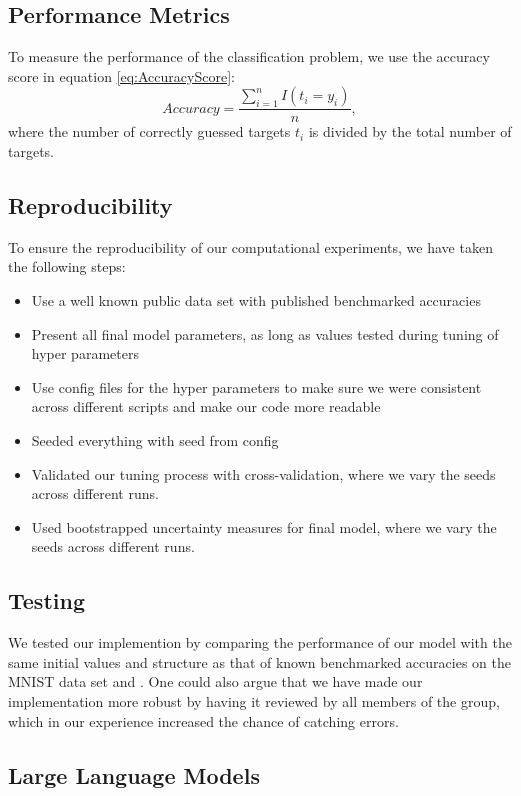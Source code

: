 \subsection{Performance Metrics}

To measure the performance of the classification problem, we use the accuracy score in equation \ref{eq:AccuracyScore}: \begin{equation}
    Accuracy = \frac{\sum_{i=1}^n I(t_i = y_i)}{n},
    \label{eq:AccuracyScore}
\end{equation}
where the number of correctly guessed targets $t_i$ is divided by the total number of targets.

\subsection{Reproducibility}
To ensure the reproducibility of our computational experiments, we have taken the following steps:
\begin{itemize}
    \item Use a well known public data set with published benchmarked accuracies
    \item Present all final model parameters, as long as values tested during tuning of hyper parameters
    \item Use config files for the hyper parameters to make sure we were consistent across different scripts and make our code more readable
    \item Seeded everything with seed from config
    \item Validated our tuning process with cross-validation, where we vary the seeds across different runs. 
    \item Used bootstrapped uncertainty measures for final model, where we vary the seeds across different runs. 
\end{itemize}

\subsection{Testing}
We tested our implemention by comparing the performance of our model with the same initial values and structure as that of known benchmarked accuracies on the MNIST data set \cite{raschka2022machine} and \cite{lecun2015deep}. One could also argue that we have made our implementation more robust by having it reviewed by all members of the group, which in our experience increased the chance of catching errors. 
\subsection{Large Language Models}

